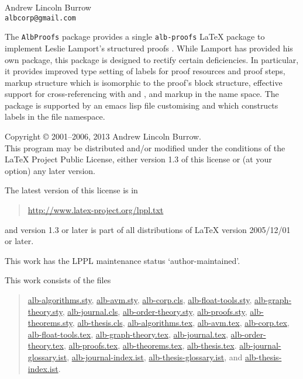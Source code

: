 \documentclass[11pt,a4paper,oneside,titlepage]{alb-corp}
\begin{document}



\begin{albTitlePage}


  Andrew Lincoln Burrow\\
  \texttt{albcorp@gmail.com}



  The \texttt{AlbProofs} package provides a single \texttt{alb-proofs}
  \LaTeX{} package to implement Leslie Lamport's structured proofs
  \citep{lamport93:_how_write_proof}.  While Lamport has provided his
  own package, this package is designed to rectify certain deficiencies.
  In particular, it provides improved type setting of labels for proof
  resources and proof steps, markup structure which is isomorphic to the
  proof's block structure, effective support for cross-referencing with
  \AUCTeX{} and \RefTeX{}, and markup in the \albLogo{} name space.  The
  package is supported by an emacs lisp file customising \AUCTeX{} and
  \RefTeX{} which constructs labels in the file namespace.



  Copyright \copyright{} 2001--2006, 2013 Andrew Lincoln Burrow.\\
  This program may be distributed and/or modified under the conditions
  of the \LaTeX{} Project Public License, either version 1.3 of this
  license or (at your option) any later version.

  \medskip{}

  The latest version of this license is in
  \begin{quote}
    \url{http://www.latex-project.org/lppl.txt}
  \end{quote}
  and version 1.3 or later is part of all distributions of LaTeX version
  2005/12/01 or later.

  \medskip{}

  This work has the LPPL maintenance status `author-maintained'.

  \medskip{}

  This work consists of the files
  \begin{quote}
    \begin{flushleft}
      \url{alb-algorithms.sty}, \url{alb-avm.sty}, \url{alb-corp.cls},
      \url{alb-float-tools.sty}, \url{alb-graph-theory.sty},
      \url{alb-journal.cls}, \url{alb-order-theory.sty},
      \url{alb-proofs.sty}, \url{alb-theorems.sty},
      \url{alb-thesis.cls}, \url{alb-algorithms.tex}, \url{alb-avm.tex},
      \url{alb-corp.tex}, \url{alb-float-tools.tex},
      \url{alb-graph-theory.tex}, \url{alb-journal.tex},
      \url{alb-order-theory.tex}, \url{alb-proofs.tex},
      \url{alb-theorems.tex}, \url{alb-thesis.tex}.
      \url{alb-journal-glossary.ist}, \url{alb-journal-index.ist},
      \url{alb-thesis-glossary.ist}, and \url{alb-thesis-index.ist}.
    \end{flushleft}
  \end{quote}



\end{albTitlePage}
\end{document}
